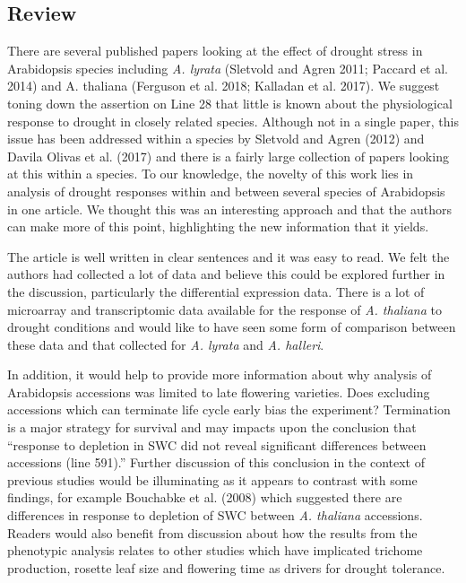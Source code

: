 \documentclass[10pt]{article}
\begin{document}
\par\null

\subsection*{Review}

{\label{963733}}

There are several published papers looking at the effect of drought
stress in Arabidopsis species including \emph{A. lyrata} (Sletvold and
Agren 2011; Paccard et al. 2014) and A. thaliana (Ferguson et al. 2018;
Kalladan et al. 2017). We suggest toning down the assertion on Line 28
that little is known about the physiological response to drought in
closely related species. Although not in a single paper, this issue has
been addressed within a species by Sletvold and Agren (2012) and Davila
Olivas et al. (2017) and there is a fairly large collection of papers
looking at this within a species. To our knowledge, the novelty of this
work lies in analysis of drought responses within and between several
species of Arabidopsis in one article. We thought this was an
interesting approach and that the authors can make more of this point,
highlighting the new information that it yields.

\par\null

The article is well written in clear sentences and it was easy to read.
We felt the authors had collected a lot of data and believe this could
be explored further in the discussion, particularly the differential
expression data. There is a lot of microarray and transcriptomic data
available for the response of \emph{A. thaliana} to drought conditions
and would like to have seen some form of comparison between these data
and that collected for \emph{A. lyrata} and \emph{A. halleri}.

\par\null

In addition, it would help to provide more information about why
analysis of Arabidopsis accessions was limited to late flowering
varieties. Does excluding accessions which can terminate life cycle
early bias the experiment? Termination is a major strategy for survival
and may impacts upon the conclusion that ``response to depletion in SWC
did not reveal significant differences between accessions (line 591).''
Further discussion of this conclusion in the context of previous studies
would be illuminating as it appears to contrast with some findings, for
example Bouchabke et al. (2008) which suggested there are differences in
response to depletion of SWC between \emph{A. thaliana} accessions.
Readers would also benefit from discussion about how the results from
the phenotypic analysis relates to other studies which have implicated
trichome production, rosette leaf size and flowering time as drivers for
drought tolerance.
\end{document}
